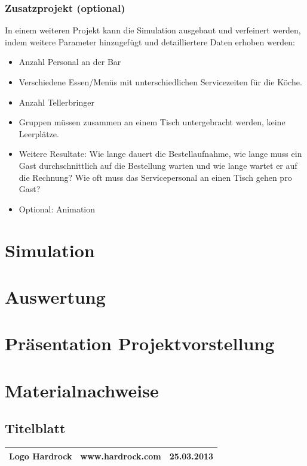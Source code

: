 \documentclass[ngerman,a4paper,12pt]{scrreprt}
\begin{document}
\subsection{Zusatzprojekt (optional)}
In einem weiteren Projekt kann die Simulation ausgebaut und verfeinert werden, indem weitere Parameter hinzugefügt  und detailliertere Daten erhoben werden:
\begin{itemize}
	\item Anzahl Personal an der Bar
	\item Verschiedene Essen/Menüs mit unterschiedlichen Servicezeiten für die Köche.
	\item Anzahl Tellerbringer
	\item Gruppen müssen zusammen an einem Tisch untergebracht werden, keine Leerplätze.
	\item Weitere Resultate: Wie lange dauert die Bestellaufnahme, wie lange muss ein Gast durchschnittlich auf die Bestellung warten und wie lange wartet er auf die Rechnung? Wie oft muss das Servicepersonal an einen Tisch gehen pro Gast?
	\item Optional: Animation
\end{itemize}


\chapter{Simulation}


\chapter{Auswertung}



\appendix
\chapter{Präsentation Projektvorstellung}


\listoffigures

\chapter{Materialnachweise}
\section{Titelblatt}
\begin{tabularx}{\textwidth}{|Xlr|}
		\hline
		Logo Hardrock & www.hardrock.com & 25.03.2013 \\
		\hline
\end{tabularx}
\end{document}
